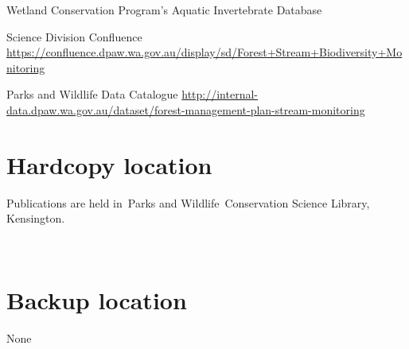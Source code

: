 \documentclass[version=last, 
    paper=a4, %
    10pt, %
    usenames,
    dvipsnames, 
    oneside, %
    headings=openany, %
    DIV=15 %
]{scrbook}
\begin{document}
Wetland Conservation Program's Aquatic Invertebrate Database

Science Division Confluence
\href{https://confluence.dpaw.wa.gov.au/display/sd/Forest+Stream+Biodiversity+Monitoring}{https://confluence.dpaw.wa.gov.au/display/sd/Forest+Stream+Biodiversity+Monitoring}

Parks and Wildlife Data Catalogue
\href{http://internal-data.dpaw.wa.gov.au/dataset/forest-management-plan-stream-monitoring}{http://internal-data.dpaw.wa.gov.au/dataset/forest-management-plan-stream-monitoring}



\section*{Hardcopy location}
Publications are held in~Parks and Wildlife~Conservation Science
Library, Kensington.

~



\section*{Backup location}
None



\end{document}
